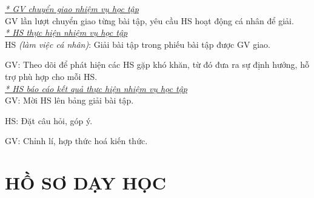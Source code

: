 {
	\textit{\underline{* GV chuyển giao nhiệm vụ học tập}}\\
	GV lần lượt chuyển giao từng bài tập, yêu cầu HS hoạt động cá nhân để giải.\\
	\textit{\underline{* HS thực hiện nhiệm vụ học tập}}\\
	HS \textit{(làm việc cá nhân)}:  Giải bài tập trong phiếu bài tập được GV giao. 
	
	GV: Theo dõi để phát hiện các HS gặp khó khăn, từ đó đưa ra sự định hướng, hỗ trợ phù hợp cho mỗi HS.\\
	\textit{\underline{* HS báo cáo kết quả thực hiện nhiệm vụ học tập}}\\
	GV: Mời HS lên bảng giải bài tập.
	
	HS: Đặt câu hỏi, góp ý.
	
	GV: Chỉnh lí, hợp thức hoá kiến thức.
}
\section{HỒ SƠ DẠY HỌC}
